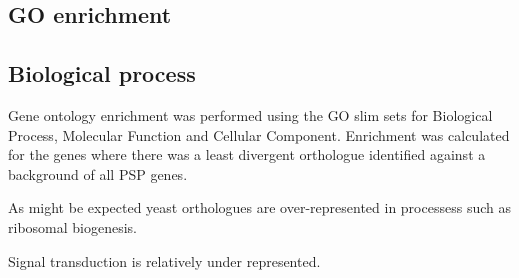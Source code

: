 \subsection{GO enrichment}
\subsection{Biological process}
Gene ontology enrichment was performed using the GO slim sets for Biological Process, Molecular Function and Cellular Component. Enrichment was calculated for the genes where there was a least divergent orthologue identified against a background of all PSP genes. 

As might be expected yeast orthologues are over-represented in processess such as ribosomal biogenesis.

Signal transduction is relatively under represented. 
